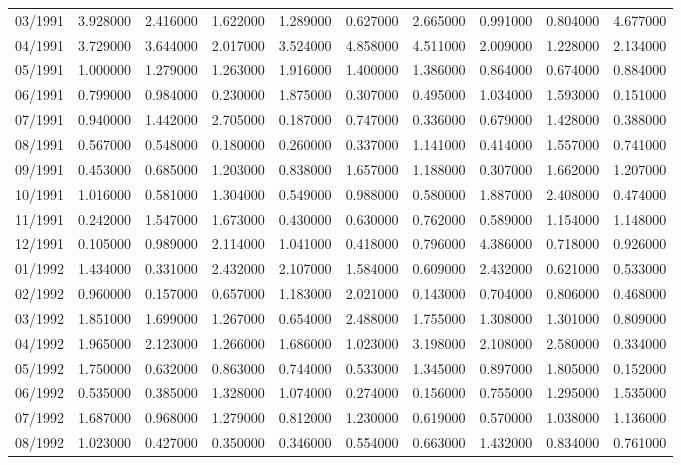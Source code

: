 \begin{tabular}{lrrrrrrrrr}
03/1991 & 3.928000 & 2.416000 & 1.622000 & 1.289000 & 0.627000 & 2.665000 & 0.991000 & 0.804000 & 4.677000 \\
04/1991 & 3.729000 & 3.644000 & 2.017000 & 3.524000 & 4.858000 & 4.511000 & 2.009000 & 1.228000 & 2.134000 \\
05/1991 & 1.000000 & 1.279000 & 1.263000 & 1.916000 & 1.400000 & 1.386000 & 0.864000 & 0.674000 & 0.884000 \\
06/1991 & 0.799000 & 0.984000 & 0.230000 & 1.875000 & 0.307000 & 0.495000 & 1.034000 & 1.593000 & 0.151000 \\
07/1991 & 0.940000 & 1.442000 & 2.705000 & 0.187000 & 0.747000 & 0.336000 & 0.679000 & 1.428000 & 0.388000 \\
08/1991 & 0.567000 & 0.548000 & 0.180000 & 0.260000 & 0.337000 & 1.141000 & 0.414000 & 1.557000 & 0.741000 \\
09/1991 & 0.453000 & 0.685000 & 1.203000 & 0.838000 & 1.657000 & 1.188000 & 0.307000 & 1.662000 & 1.207000 \\
10/1991 & 1.016000 & 0.581000 & 1.304000 & 0.549000 & 0.988000 & 0.580000 & 1.887000 & 2.408000 & 0.474000 \\
11/1991 & 0.242000 & 1.547000 & 1.673000 & 0.430000 & 0.630000 & 0.762000 & 0.589000 & 1.154000 & 1.148000 \\
12/1991 & 0.105000 & 0.989000 & 2.114000 & 1.041000 & 0.418000 & 0.796000 & 4.386000 & 0.718000 & 0.926000 \\
01/1992 & 1.434000 & 0.331000 & 2.432000 & 2.107000 & 1.584000 & 0.609000 & 2.432000 & 0.621000 & 0.533000 \\
02/1992 & 0.960000 & 0.157000 & 0.657000 & 1.183000 & 2.021000 & 0.143000 & 0.704000 & 0.806000 & 0.468000 \\
03/1992 & 1.851000 & 1.699000 & 1.267000 & 0.654000 & 2.488000 & 1.755000 & 1.308000 & 1.301000 & 0.809000 \\
04/1992 & 1.965000 & 2.123000 & 1.266000 & 1.686000 & 1.023000 & 3.198000 & 2.108000 & 2.580000 & 0.334000 \\
05/1992 & 1.750000 & 0.632000 & 0.863000 & 0.744000 & 0.533000 & 1.345000 & 0.897000 & 1.805000 & 0.152000 \\
06/1992 & 0.535000 & 0.385000 & 1.328000 & 1.074000 & 0.274000 & 0.156000 & 0.755000 & 1.295000 & 1.535000 \\
07/1992 & 1.687000 & 0.968000 & 1.279000 & 0.812000 & 1.230000 & 0.619000 & 0.570000 & 1.038000 & 1.136000 \\
08/1992 & 1.023000 & 0.427000 & 0.350000 & 0.346000 & 0.554000 & 0.663000 & 1.432000 & 0.834000 & 0.761000 \\

\end{tabular}
